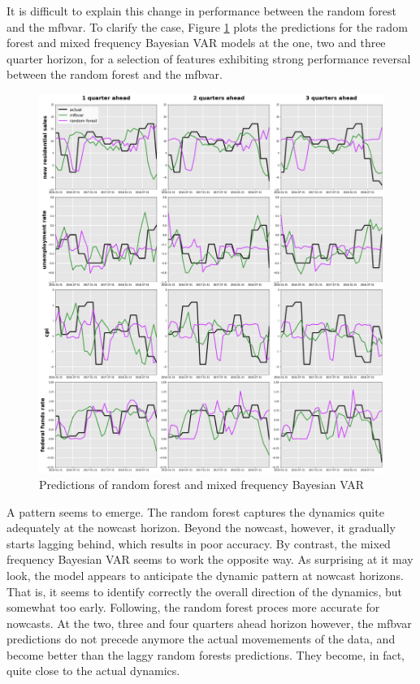 It is difficult to explain this change in performance between the random forest and the mfbvar. To clarify the case, Figure \ref{fig_c4_s4_2} plots the predictions for the radom forest and mixed frequency Bayesian VAR models at the one, two and three quarter horizon, for a selection of features exhibiting strong performance reversal between the random forest and the mfbvar.

\begin{figure}[H]
\centering
\includegraphics[scale=0.32]{images/predictions_mfbvar_rf.png}
\caption{Predictions of random forest and mixed frequency Bayesian VAR} \vspace{-5mm}
\label{fig_c4_s4_2}
\end{figure}

A pattern seems to emerge. The random forest captures the dynamics quite adequately at the nowcast horizon. Beyond the nowcast, however, it gradually starts lagging behind, which results in poor accuracy. By contrast, the mixed frequency Bayesian VAR seems to work the opposite way. As surprising at it may look, the model appears to anticipate the dynamic pattern at nowcast horizons. That is, it seems to identify correctly the overall direction of the dynamics, but somewhat too early. Following, the random forest proces more accurate for nowcasts. At the two, three and four quarters ahead horizon however, the mfbvar predictions do not precede anymore the actual movemements of the data, and become better than the laggy random forests predictions. They become, in fact, quite close to the actual dynamics.

